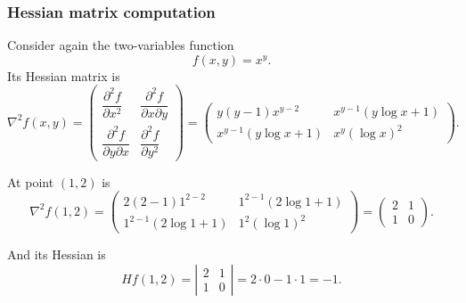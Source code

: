 \begin{frame}
\frametitle{Hessian matrix computation}
Consider again the two-variables function 
\[f(x,y)=x^y.\]
Its Hessian matrix is
\[
\nabla^2f(x,y)=\left(
\begin{array}{cc}
\dfrac{\partial^2 f}{\partial x^2} & \dfrac{\partial^2 f}{\partial x \partial y}\\
\dfrac{\partial^2 f}{\partial y \partial x} & \dfrac{\partial^2 f}{\partial y^2}
\end{array}
\right)
=
\left(
\begin{array}{cc}
y(y-1)x^{y-2} & x^{y-1}(y\log x+1) \\
x^{y-1}(y\log x+1) & x^y(\log x)^2
\end{array}
\right).
\]

At point $(1,2)$ is
\[
\nabla^2f(1,2)=\left(
\begin{array}{cc}
2(2-1)1^{2-2} & 1^{2-1}(2\log 1+1) \\
1^{2-1}(2\log 1+1) & 1^2(\log 1)^2
\end{array}
\right)
=
\left(
\begin{array}{cc}
2 & 1 \\
1 & 0
\end{array}
\right).
\]

And its Hessian is
\[
Hf(1,2)=\left|
\begin{array}{cc}
2 & 1 \\
1 & 0
\end{array}
\right|=
2\cdot 0-1\cdot1= -1.
\]
\end{frame}
% 
% 
% 
